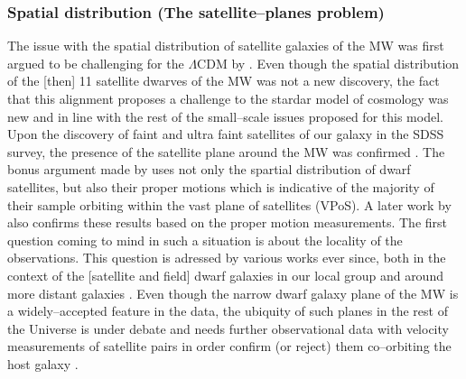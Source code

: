 \documentclass[paper=a4, fontsize=11pt]{scrartcl} %
\numberwithin{equation}{section} %
\numberwithin{figure}{section} %
\numberwithin{table}{section} %
\begin{document}





\subsubsection{Spatial distribution (The satellite--planes problem)}
The issue with the spatial distribution of satellite galaxies of the MW was first argued to be challenging for the $\Lambda$CDM by \citet[][]{Ktoupa+2005}. Even though the spatial distribution of the [then] 11 satellite dwarves of the MW was not a new discovery, the fact that this alignment proposes a challenge to the stardar model of cosmology was new and in line with the rest of the small--scale issues proposed for this model. Upon the discovery of faint and ultra faint satellites of our galaxy in the SDSS survey, the presence of the satellite plane around the MW was confirmed \citep[][]{Metz+2009, Kroupa+2010}. The bonus argument made by \citet[][]{Metz+2009} uses not only the spartial distribution of dwarf satellites, but also their proper motions which is indicative of the majority of their sample orbiting within the vast plane of satellites (VPoS). A later work by \citet[][]{Pawlowski+2013} also confirms these results based on the proper motion measurements. The first question coming to mind in such a situation is about the locality of the observations. This question is adressed by various works ever since, both in the context of the [satellite and field] dwarf galaxies in our local group \citep[see e.g. ][]{Ibata+2013, Pawlowski+2013, Bellazzini+2013, Pawlowski.McGaugh2014a} and around more distant galaxies \citep[see e.g. ][]{Tully+2015, Muller+2015}. Even though the narrow dwarf galaxy plane of the MW is a widely--accepted feature in the data, the ubiquity of such planes in the rest of the Universe is under debate and needs further observational data with velocity measurements of satellite pairs in order confirm (or reject) them co--orbiting the host galaxy \citet[for opposite views on the matter see e.g. ][]{Phillips+2015, Cautun+2015}.
\end{document}
